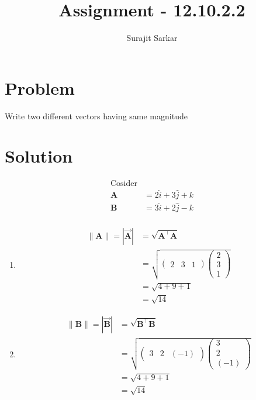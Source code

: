 \documentclass[12pt]{article}
\title{\mytitle}
\title{
Assignment - 12.10.2.2
}
\author{Surajit Sarkar}
\newcommand{\myvec}[1]{\ensuremath{\begin{pmatrix}#1\end{pmatrix}}}
\let\vec\mathbf
\begin{document}
\maketitle
\tableofcontents
\bigskip
\section{\textbf{Problem}}
Write two different vectors having same magnitude
\section{\textbf{Solution}}
\begin{align}
\text{Cosider}\\
\vec{A} &=2\hat{i}+3\hat{j}+k \\ 
\vec{B}&=3\hat{i}+2\hat{j}-k\\ 
\end{align}
\begin{enumerate}
    \item 
\begin{align}
\|\vec{A}\|=|\overrightarrow{\vec{A}}|&=\sqrt{\vec{A}^{\top}\vec{A}} \\
&=\sqrt{\myvec{2&3&1}\myvec{2\\3\\1}}\\
&=\sqrt{4+9+1}\\
&=\sqrt{14}
\end{align}
\item
\begin{align}
\|\vec{B}\|=|\overrightarrow{\vec{B}}|&=\sqrt{\vec{B}^{\top}\vec{B}} \\
&=\sqrt{\myvec{3&2&(-1)}\myvec{3\\2\\(-1)}}\\
&=\sqrt{4+9+1}\\
&=\sqrt{14}
\end{align}
\end{enumerate}
\end{document}

